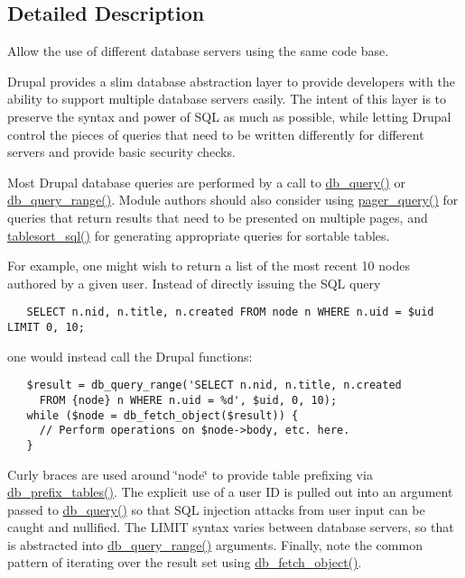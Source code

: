 \subsection{Detailed Description}
Allow the use of different database servers using the same code base.

Drupal provides a slim database abstraction layer to provide developers with the ability to support multiple database servers easily. The intent of this layer is to preserve the syntax and power of SQL as much as possible, while letting Drupal control the pieces of queries that need to be written differently for different servers and provide basic security checks.

Most Drupal database queries are performed by a call to \hyperlink{database_8mysql-common_8inc_9e096321b86945d128746ac7bedce8f3}{db\_\-query()} or \hyperlink{database_8mysql_8inc_893cbcab2ecf321005eae4e278adc22b}{db\_\-query\_\-range()}. Module authors should also consider using \hyperlink{group__database_ge456e13108bb88fa7a532e1cccdeaa50}{pager\_\-query()} for queries that return results that need to be presented on multiple pages, and \hyperlink{group__database_gd893ca6e60341e448203269c520696ce}{tablesort\_\-sql()} for generating appropriate queries for sortable tables.

For example, one might wish to return a list of the most recent 10 nodes authored by a given user. Instead of directly issuing the SQL query 

\begin{Code}\begin{verbatim}   SELECT n.nid, n.title, n.created FROM node n WHERE n.uid = $uid LIMIT 0, 10;
\end{verbatim}
\end{Code}

 one would instead call the Drupal functions: 

\begin{Code}\begin{verbatim}   $result = db_query_range('SELECT n.nid, n.title, n.created
     FROM {node} n WHERE n.uid = %d', $uid, 0, 10);
   while ($node = db_fetch_object($result)) {
     // Perform operations on $node->body, etc. here.
   }
\end{verbatim}
\end{Code}

 Curly braces are used around \char`\"{}node\char`\"{} to provide table prefixing via \hyperlink{group__database_gdb274339376ae7e48e3ea4da4c1de0b1}{db\_\-prefix\_\-tables()}. The explicit use of a user ID is pulled out into an argument passed to \hyperlink{database_8mysql-common_8inc_9e096321b86945d128746ac7bedce8f3}{db\_\-query()} so that SQL injection attacks from user input can be caught and nullified. The LIMIT syntax varies between database servers, so that is abstracted into \hyperlink{database_8mysql_8inc_893cbcab2ecf321005eae4e278adc22b}{db\_\-query\_\-range()} arguments. Finally, note the common pattern of iterating over the result set using \hyperlink{database_8mysql_8inc_5faaeba7105d28828db453b4fd3c75d4}{db\_\-fetch\_\-object()}. 

